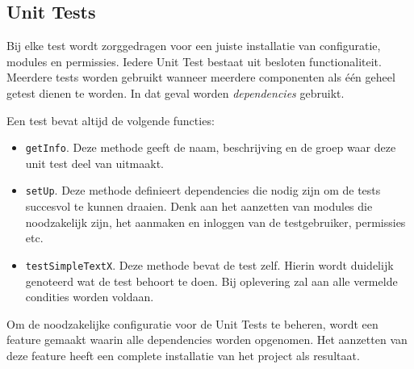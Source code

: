 \subsection{Unit Tests}

Bij elke test wordt zorggedragen voor een juiste installatie van configuratie, modules en permissies. Iedere Unit Test bestaat uit besloten functionaliteit. Meerdere tests worden gebruikt wanneer meerdere componenten als \'{e}\'{e}n geheel getest dienen te worden. In dat geval worden \emph{dependencies} gebruikt.

Een test bevat altijd de volgende functies:
\begin{itemize}
\item \texttt{getInfo}. Deze methode geeft de naam, beschrijving en de groep waar deze unit test deel van uitmaakt.
\item \texttt{setUp}. Deze methode definieert dependencies die nodig zijn om de tests succesvol te kunnen draaien. Denk aan het aanzetten van modules die noodzakelijk zijn, het aanmaken en inloggen van de testgebruiker, permissies etc.
\item \texttt{testSimpleTextX}. Deze methode bevat de test zelf. Hierin wordt duidelijk genoteerd wat de test behoort te doen. Bij oplevering zal aan alle vermelde condities worden voldaan.
\end{itemize}

Om de noodzakelijke configuratie voor de Unit Tests te beheren, wordt een feature gemaakt waarin alle dependencies worden opgenomen. Het aanzetten van deze feature heeft een complete installatie van het \projectname  project als resultaat.


